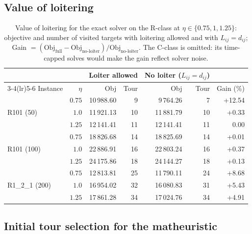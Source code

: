 \documentclass[11pt]{article}
\let\originalsubsection\subsection
\renewcommand{\subsection}{\FloatBarrier\originalsubsection}
\begin{document}
\subsection{Value of loitering}\label{subsec:loitering}


\begin{table}[H]
\centering\small
\caption{Value of loitering for the exact solver on the R-class at $\eta \in \{0.75, 1, 1.25\}$: objective and number of visited targets with loitering allowed and with $L_{ij} = d_{ij}$; Gain $= (\text{Obj}_{\text{full}} - \text{Obj}_{\text{no-loiter}})/\text{Obj}_{\text{no-loiter}}$. The C-class is omitted: its time-capped solves would make the gain reflect solver noise.}\label{tab:loitering}
\begin{tabular}{l r rr rr r}
\toprule
& & \multicolumn{2}{c}{Loiter allowed} & \multicolumn{2}{c}{No loiter ($L_{ij} = d_{ij}$)} & \\
\cmidrule(lr){3-4}\cmidrule(lr){5-6}
Instance & $\eta$ & Obj & Tour & Obj & Tour & Gain (\%) \\
\midrule
\multirow{3}{*}{R101 (50)}
& $0.75$ & 10\,988.60 & 9 & 9\,764.26 & 7 & +12.54 \\
& $1.0$ & 11\,921.13 & 10 & 11\,881.79 & 10 & +0.33 \\
& $1.25$ & 12\,141.41 & 11 & 12\,141.41 & 11 & 0.00 \\
\midrule
\multirow{3}{*}{R101 (100)}
& $0.75$ & 18\,826.68 & 14 & 18\,825.69 & 14 & +0.01 \\
& $1.0$ & 22\,886.91 & 16 & 22\,803.24 & 16 & +0.37 \\
& $1.25$ & 24\,175.86 & 18 & 24\,144.27 & 18 & +0.13 \\
\midrule
\multirow{3}{*}{R1\_2\_1 (200)}
& $0.75$ & 12\,813.81 & 25 & 11\,790.11 & 24 & +8.68 \\
& $1.0$ & 16\,954.02 & 32 & 16\,080.83 & 31 & +5.43 \\
& $1.25$ & 17\,861.28 & 34 & 17\,024.76 & 34 & +4.91 \\
\bottomrule
\end{tabular}
\end{table}

\subsection{Initial tour selection for the matheuristic}\label{subsec:initial-selection}
\end{document}
